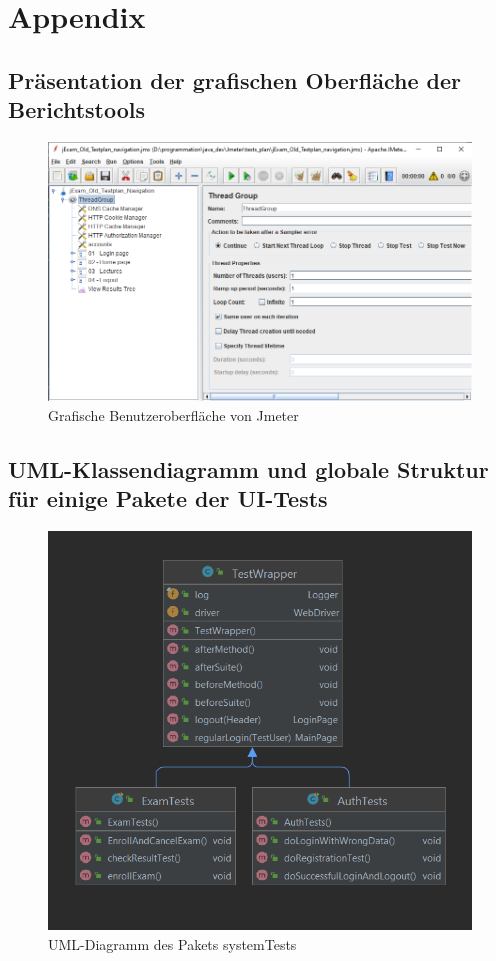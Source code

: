\chapter{Appendix}




\section{Präsentation der grafischen Oberfläche der Berichtstools}

\begin{figure}[H]
    \centering
    \includegraphics[scale=0.6]{images/jmeter-ui}
    \caption{Grafische Benutzeroberfläche von Jmeter} \label{fig:jmeter}
\end{figure}

\section{UML-Klassendiagramm und globale Struktur für einige Pakete der UI-Tests}

\begin{figure}[H]
    \centering
    \includegraphics[scale=0.5]{images/system-test-uml}
    \caption{UML-Diagramm des Pakets systemTests} \label{fig:system-package}
\end{figure}

